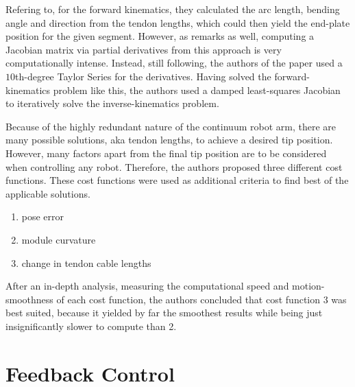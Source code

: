 Refering to\cite{godage_modal_2015}, for the forward kinematics, they calculated the arc length, bending angle and direction from the tendon lengths, which could then yield the end-plate position for the given segment.
However, as\cite{godage_modal_2015} remarks as well, computing a Jacobian matrix via partial derivatives from this approach is very computationally intense.
Instead, still following\cite{godage_modal_2015}, the authors of the paper used a $10$th-degree Taylor Series for the derivatives.
Having solved the forward-kinematics problem like this, the authors used a damped least-squares Jacobian to iteratively solve the inverse-kinematics problem.

Because of the highly redundant nature of the continuum robot arm, there are many possible solutions, aka tendon lengths, to achieve a desired tip position.
However, many factors apart from the final tip position are to be considered when controlling any robot.
Therefore, the authors proposed three different cost functions.
These cost functions were used as additional criteria to find best of the applicable solutions.

\begin{enumerate}
    \item pose error
    \item module curvature
    \item change in tendon cable lengths
\end{enumerate}

After an in-depth analysis, measuring the computational speed and motion-smoothness of each cost function, the authors concluded that cost function $3$ was best suited, because it yielded by far the smoothest results while being just insignificantly slower to compute than 2\cite{santoso_origami_2021}.


\section{Feedback Control}\label{sec:feedback-control}

